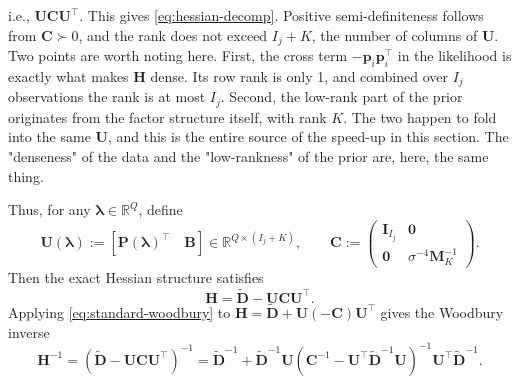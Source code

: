 i.e., $\mathbf{U}\mathbf{C}\mathbf{U}^{\top}$. This gives \eqref{eq:hessian-decomp}. Positive semi-definiteness follows from $\mathbf{C}\succ 0$, and the rank does not exceed $I_{j}+K$, the number of columns of $\mathbf{U}$. Two points are worth noting here. First, the cross term $-\bm{p}_{i}\bm{p}_{i}^{\top}$ in the likelihood is exactly what makes $\mathbf{H}$ dense. Its row rank is only 1, and combined over $I_{j}$ observations the rank is at most $I_{j}$. Second, the low-rank part of the prior originates from the factor structure itself, with rank $K$. The two happen to fold into the same $\mathbf{U}$, and this is the entire source of the speed-up in this section. The "denseness" of the data and the "low-rankness" of the prior are, here, the same thing.

Thus, for any $\bm{\lambda}\in\mathbb{R}^{Q}$, define
\begin{equation}
    \mathbf{U}\left(\bm{\lambda}\right):=\left[\mathbf{P}\left(\bm{\lambda}\right)^{\top} \quad \mathbf{B}\right]\in \mathbb{R}^{Q\times (I_{j}+K)}, \qquad \mathbf{C}:=\begin{pmatrix}
    \mathbf{I}_{I_{j}}
    &
    \bm{0}
    \\
    \bm{0}
    &
    \sigma^{-4}\mathbf{M}_{K}^{-1}
    \end{pmatrix}.
    \label{eq:wb-decomp}
\end{equation}
Then the exact Hessian structure satisfies
\begin{equation}
    \mathbf{H}=\tilde{\mathbf{D}}-\mathbf{U}\mathbf{C}\mathbf{U}^{\top}.
    \label{eq:hessian-decomp}
\end{equation}
Applying \eqref{eq:standard-woodbury} to $\mathbf H=\tilde{\mathbf D}+\mathbf U(-\mathbf C)\mathbf U^\top$ gives the Woodbury inverse
\begin{equation}
    \mathbf{H}^{-1}=\left(\tilde{\mathbf{D}}-\mathbf{U}\mathbf{C}\mathbf{U}^{\top}\right)^{-1} =\tilde{\mathbf{D}}^{-1} + \tilde{\mathbf{D}}^{-1}\mathbf{U}\left(\mathbf{C}^{-1} - \mathbf{U}^{\top}\tilde{\mathbf{D}}^{-1}\mathbf{U}\right)^{-1}\mathbf{U}^{\top}\tilde{\mathbf{D}}^{-1}.
    \label{eq:hessian-decomp-wb}
\end{equation}

